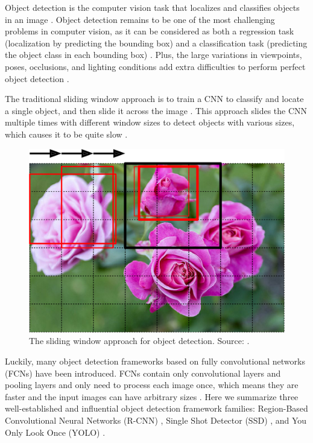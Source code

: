 \documentclass[a4paper, 11pt, oneside]{article}
\begin{document}
\label{sec:objectdetection}

Object detection is the computer vision task that localizes and classifies objects in an image
\cite{elgendy2020deep, zhao2019object, liu2020deep, geron2019hands}. Object detection remains to be one of the most
challenging problems in computer vision, as it can be considered as both a regression task (localization by predicting
the bounding box) and a classification task (predicting the object class in each bounding box)
\cite{elgendy2020deep, girshick2014rich, geron2019hands}. Plus, the large variations in viewpoints, poses, occlusions,
and lighting conditions add extra difficulties to perform perfect object detection \cite{zhao2019object, liu2020deep}.

The traditional sliding window approach is to train a CNN to classify and locate a single object, and then slide it
across the image \cite{geron2019hands, pasquet2017amphora, girshick2014rich, redmon2016you}. This approach slides the
CNN multiple times with different window sizes to detect objects with various sizes, which causes it to be quite slow
\cite{geron2019hands}.

\begin{figure}[ht]
  \begin{center}
    \includegraphics[width=.5\textwidth]{sliding_window.png}
  \end{center}
  \caption{The sliding window approach for object detection. Source: \cite{o2019deep}.}
\end{figure}

Luckily, many object detection frameworks based on fully convolutional networks (FCNs) \cite{long2015fully} have been
introduced. FCNs contain only convolutional layers and pooling layers and only need to process each image once, which
means they are faster and the input images can have arbitrary sizes \cite{elgendy2020deep, geron2019hands, long2015fully}.
Here we summarize three well-established and influential object detection framework families: Region-Based Convolutional
Neural Networks (R-CNN) \cite{girshick2014rich, girshick2015fast, ren2015faster}, Single Shot Detector (SSD)
\cite{liu2016ssd}, and You Only Look Once (YOLO)
\cite{redmon2016you, redmon2017yolo9000, redmon2018yolov3, bochkovskiy2020yolov4, yolov5}.
\end{document}

